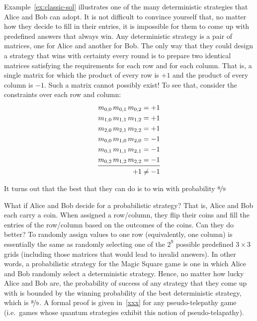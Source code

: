 \documentclass{llncs}
\begin{document}
Example~\ref{ex:classic-sol} illustrates one of the many deterministic
strategies that Alice and Bob can adopt. It is not difficult to
convince yourself that, no matter how they decide to fill in their
entries, it is impossible for them to come up with predefined answers
that always win. Any deterministic strategy is a pair of matrices, one
for Alice and another for Bob. The only way that they could design a
strategy that wins with certainty every round is to prepare two
identical matrices satisfying the requirements for each row and for
each column. That is, a single matrix for which the product of every
row is \(+1\) and the product of every column is \(-1\). Such a matrix
cannot possibly exist!  To see that, consider the constraints over
each row and column:
\[\begin{aligned}
    m_{0,0}\, m_{0,1}\, m_{0,2} &= +1 \\
    m_{1,0}\, m_{1,1}\, m_{1,2} &= +1 \\
    m_{2,0}\, m_{2,1}\, m_{2,2} &= +1 \\
    m_{0,0}\, m_{1,0}\, m_{2,0} &= -1 \\
    m_{0,1}\, m_{1,1}\, m_{2,1} &= -1 \\
    m_{0,2}\, m_{1,2}\, m_{2,2} &= -1 \\
    \midrule
    +1 &\neq -1
  \end{aligned}\]

It turns out that the best that they can do is to win
with probability \(\nicefrac{8}{9}\)

What if Alice and Bob decide for a probabilistic strategy? That is, Alice and
Bob each carry a coin. When assigned a row/column, they flip their
coins and fill the entries of the row/column based on the outcomes of
the coins. Can they do better? To randomly assign values to one row
(equivalently, one column) is essentially the same as randomly
selecting one of the \(2^{9}\) possible predefined \(3 \times 3\)
grids (including those matrices that would lead to invalid
answers). In other words, a probabilistic strategy for the Magic
Square game is one in which Alice and Bob randomly select a
deterministic strategy. Hence, no matter how lucky Alice and Bob are,
the probability of success of any strategy that they come up with is
bounded by the winning probability of the best deterministic strategy,
which is \(\nicefrac{8}{9}\). A formal proof is given in~\ref{xxx}
for any pseudo-telepathy game (i.e.\ games whose quantum strategies
exhibit this notion of pseudo-telapathy).
\end{document}
